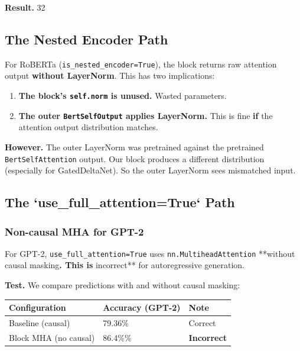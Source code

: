 \textbf{Result.} 32

\subsection{The Nested Encoder Path}

For RoBERTa (\texttt{is\_nested\_encoder=True}), the block returns raw attention 
output \textbf{without LayerNorm}. This has two implications:

\begin{enumerate}
\item \textbf{The block's \texttt{self.norm} is unused.} Wasted parameters.
\item \textbf{The outer \texttt{BertSelfOutput} applies LayerNorm.} This is fine \textbf{if}
  the attention output distribution matches.

\end{enumerate}
\textbf{However.} The outer LayerNorm was pretrained against the pretrained 
\texttt{BertSelfAttention} output. Our block produces a different distribution 
(especially for GatedDeltaNet). So the outer LayerNorm sees mismatched input.

\subsection{The `use\_full\_attention=True` Path}

\subsubsection{Non-causal MHA for GPT-2}

For GPT-2, \texttt{use\_full\_attention=True} uses \texttt{nn.MultiheadAttention} **without 
causal masking\textbf{. This is }incorrect** for autoregressive generation.

\textbf{Test.} We compare predictions with and without causal masking:

\begin{table}[H]
\centering
\small
\begin{tabular}{lll}
\toprule
\textbf{Configuration} & \textbf{Accuracy (GPT-2)} & \textbf{Note} \\
\midrule
Baseline (causal) & 79.36\% & Correct \\
Block MHA (no causal) & 86.4\%\% & \textbf{Incorrect} \\
\bottomrule
\end{tabular}
\end{table}

